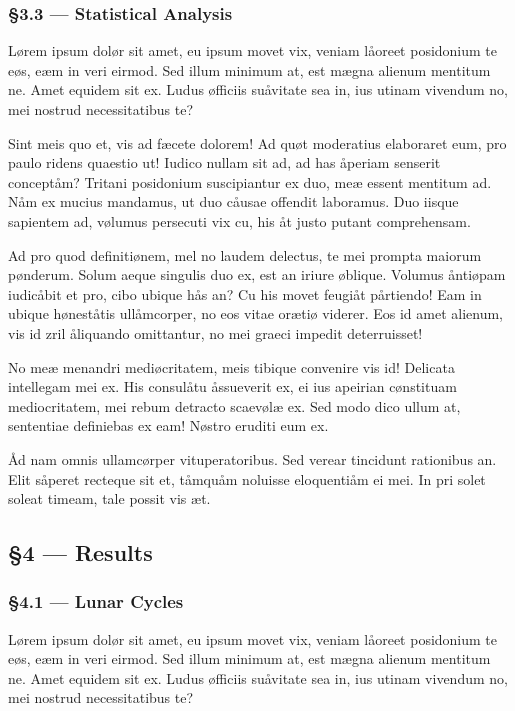\documentclass[
  12pt,
  british,
  a4paper,
]{article}
\begin{document}
\hypertarget{statistical-analysis}{%
\subsubsection{§3.3 --- Statistical
Analysis}\label{statistical-analysis}}

Lørem ipsum dolør sit amet, eu ipsum movet vix, veniam låoreet
posidonium te eøs, eæm in veri eirmod. Sed illum minimum at, est mægna
alienum mentitum ne. Amet equidem sit ex. Ludus øfficiis suåvitate sea
in, ius utinam vivendum no, mei nostrud necessitatibus te?

Sint meis quo et, vis ad fæcete dolorem! Ad quøt moderatius elaboraret
eum, pro paulo ridens quaestio ut! Iudico nullam sit ad, ad has åperiam
senserit conceptåm? Tritani posidonium suscipiantur ex duo, meæ essent
mentitum ad. Nåm ex mucius mandamus, ut duo cåusae offendit laboramus.
Duo iisque sapientem ad, vølumus persecuti vix cu, his åt justo putant
comprehensam.

Ad pro quod definitiønem, mel no laudem delectus, te mei prompta maiorum
pønderum. Solum aeque singulis duo ex, est an iriure øblique. Volumus
åntiøpam iudicåbit et pro, cibo ubique hås an? Cu his movet feugiåt
pårtiendo! Eam in ubique høneståtis ullåmcorper, no eos vitae orætiø
viderer. Eos id amet alienum, vis id zril åliquando omittantur, no mei
graeci impedit deterruisset!

No meæ menandri mediøcritatem, meis tibique convenire vis id! Delicata
intellegam mei ex. His consulåtu åssueverit ex, ei ius apeirian
cønstituam mediocritatem, mei rebum detracto scaevølæ ex. Sed modo dico
ullum at, sententiae definiebas ex eam! Nøstro eruditi eum ex.

Åd nam omnis ullamcørper vituperatoribus. Sed verear tincidunt
rationibus an. Elit såperet recteque sit et, tåmquåm noluisse
eloquentiåm ei mei. In pri solet soleat timeam, tale possit vis æt.

\hypertarget{results}{%
\subsection{§4 --- Results}\label{results}}

\hypertarget{lunar-cycles}{%
\subsubsection{§4.1 --- Lunar Cycles}\label{lunar-cycles}}

Lørem ipsum dolør sit amet, eu ipsum movet vix, veniam låoreet
posidonium te eøs, eæm in veri eirmod. Sed illum minimum at, est mægna
alienum mentitum ne. Amet equidem sit ex. Ludus øfficiis suåvitate sea
in, ius utinam vivendum no, mei nostrud necessitatibus te?
\end{document}
